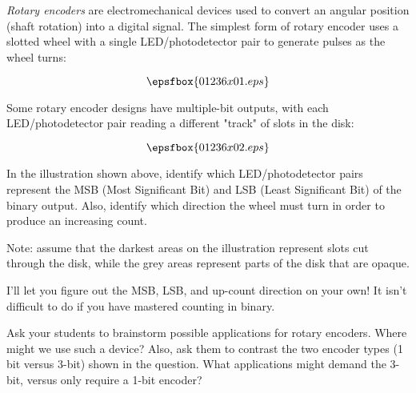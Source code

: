 

{\it Rotary encoders} are electromechanical devices used to convert an angular position (shaft rotation) into a digital signal.  The simplest form of rotary encoder uses a slotted wheel with a single LED/photodetector pair to generate pulses as the wheel turns:

$$\epsfbox{01236x01.eps}$$

Some rotary encoder designs have multiple-bit outputs, with each LED/photodetector pair reading a different "track" of slots in the disk:

$$\epsfbox{01236x02.eps}$$

In the illustration shown above, identify which LED/photodetector pairs represent the MSB (Most Significant Bit) and LSB (Least Significant Bit) of the binary output.  Also, identify which direction the wheel must turn in order to produce an increasing count.

Note: assume that the darkest areas on the illustration represent slots cut through the disk, while the grey areas represent parts of the disk that are opaque.







I'll let you figure out the MSB, LSB, and up-count direction on your own!  It isn't difficult to do if you have mastered counting in binary.







Ask your students to brainstorm possible applications for rotary encoders.  Where might we use such a device?  Also, ask them to contrast the two encoder types (1 bit versus 3-bit) shown in the question.  What applications might demand the 3-bit, versus only require a 1-bit encoder?




